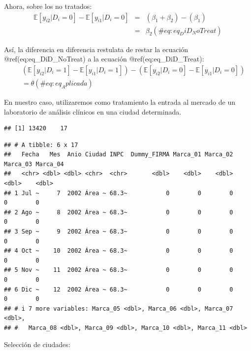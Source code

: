 \documentclass[
]{book}
\begin{document}
Ahora, sobre los no tratados:
\begin{eqnarray}
    \mathbb{E}[ y_{i2} | D_i = 0 ] - \mathbb{E}[ y_{i1} | D_i = 0 ] & = & ( \beta_1 + \beta_2 ) - ( \beta_1 ) \nonumber \\  
    & = & \beta_2 
    (\#eq:eq_DiD_NoTreat)
\end{eqnarray}

Así, la diferencia en diferencia restulata de restar la ecuación @ref(eq:eq\_DiD\_NoTreat) a la ecuación @ref(eq:eq\_DiD\_Treat):
\begin{eqnarray}
    & & ( \mathbb{E}[ y_{i2} | D_i = 1 ] - \mathbb{E}[ y_{i1} | D_i = 1 ] ) - ( \mathbb{E}[ y_{i2} | D_i = 0 ] - \mathbb{E}[ y_{i1} | D_i = 0 ] ) \nonumber \\ 
    & & = \theta 
    (\#eq:eq_Aplicada)
\end{eqnarray}

En nuestro caso, utilizaremos como tratamiento la entrada al mercado de un laboratorio de análisis clínicos en una ciudad determinada.

\begin{verbatim}
## [1] 13420    17
\end{verbatim}

\begin{verbatim}
## # A tibble: 6 x 17
##   Fecha   Mes  Anio Ciudad INPC  Dummy_FIRMA Marca_01 Marca_02 Marca_03 Marca_04
##   <chr> <dbl> <dbl> <chr>  <chr>       <dbl>    <dbl>    <dbl>    <dbl>    <dbl>
## 1 Jul ~     7  2002 Área ~ 68.3~           0        0        0        0        0
## 2 Ago ~     8  2002 Área ~ 68.3~           0        0        0        0        0
## 3 Sep ~     9  2002 Área ~ 68.3~           0        0        0        0        0
## 4 Oct ~    10  2002 Área ~ 68.3~           0        0        0        0        0
## 5 Nov ~    11  2002 Área ~ 68.3~           0        0        0        0        0
## 6 Dic ~    12  2002 Área ~ 68.3~           0        0        0        0        0
## # i 7 more variables: Marca_05 <dbl>, Marca_06 <dbl>, Marca_07 <dbl>,
## #   Marca_08 <dbl>, Marca_09 <dbl>, Marca_10 <dbl>, Marca_11 <dbl>
\end{verbatim}

Selección de ciudades:
\end{document}
